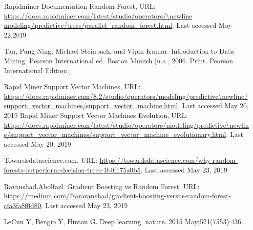\documentclass[runningheads]{llncs}
\begin{document}
\begin{thebibliography}{8}
Rapidminer Documentation Random Forest, URL: \url{https://docs.rapidminer.com/latest/studio/operators/\newline modeling/predictive/trees/parallel\_random\_forest.html}. Last accessed May 22,2019

Tan, Pang-Ning, Michael Steinbach, and Vipin Kumar. Introduction to Data Mining. Pearson International ed. Boston Munich [u.a., 2006. Print. Pearson International Edition.]

Rapid Miner Support Vector Machines, URL: \url{https://docs.rapidminer.com/8.2/studio/operators/modeling/predictive\newline/support\_vector\_machines/support\_vector\_machine.html}. Last accessed May 20, 2019
%
Rapid Miner Support Vector Machines Evolution, URL: \url{https://docs.rapidminer.com/latest/studio/operators/modeling/predictive\newline/support\_vector\_machines/support\_vector\_machine\_evolutionary.html}. Last accessed May 20, 2019

Towardsdatascience.com, URL: \url{https://towardsdatascience.com/why-random-forests-outperform-decision-trees-1b0f175a0b5}. Last accessed May 23, 2019

Ravanshad,Abolfazl. Gradient Boosting vs Random Forest. URL: \url{https://medium.com/@aravanshad/gradient-boosting-versus-random-forest-cfa3fa8f0d80}. Last accessed May 23, 2019

LeCun Y, Bengio Y, Hinton G. Deep learning. nature. 2015 May;521(7553):436.

\end{thebibliography}
\end{document}
